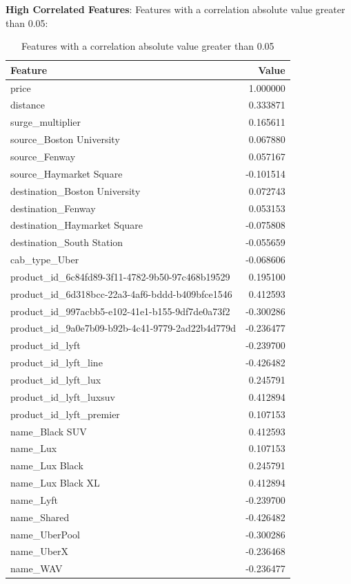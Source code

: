 \documentclass[a4paper,12pt]{article}
\begin{document}
\textbf{High Correlated Features}: Features with a correlation absolute value greater than 0.05: \\ 
\begin{table}[H]
    \centering
    \begin{tabular}{|l|r|}
    \hline
    \textbf{Feature} & \textbf{Value} \\
    \hline
    price & 1.000000 \\
    distance & 0.333871 \\
    surge\_multiplier & 0.165611 \\
    source\_Boston University & 0.067880 \\
    source\_Fenway & 0.057167 \\
    source\_Haymarket Square & -0.101514 \\
    destination\_Boston University & 0.072743 \\
    destination\_Fenway & 0.053153 \\
    destination\_Haymarket Square & -0.075808 \\
    destination\_South Station & -0.055659 \\
    cab\_type\_Uber & -0.068606 \\
    product\_id\_6c84fd89-3f11-4782-9b50-97c468b19529 & 0.195100 \\
    product\_id\_6d318bcc-22a3-4af6-bddd-b409bfce1546 & 0.412593 \\
    product\_id\_997acbb5-e102-41e1-b155-9df7de0a73f2 & -0.300286 \\
    product\_id\_9a0e7b09-b92b-4c41-9779-2ad22b4d779d & -0.236477 \\
    product\_id\_lyft & -0.239700 \\
    product\_id\_lyft\_line & -0.426482 \\
    product\_id\_lyft\_lux & 0.245791 \\
    product\_id\_lyft\_luxsuv & 0.412894 \\
    product\_id\_lyft\_premier & 0.107153 \\
    name\_Black SUV & 0.412593 \\
    name\_Lux & 0.107153 \\
    name\_Lux Black & 0.245791 \\
    name\_Lux Black XL & 0.412894 \\
    name\_Lyft & -0.239700 \\
    name\_Shared & -0.426482 \\
    name\_UberPool & -0.300286 \\
    name\_UberX & -0.236468 \\
    name\_WAV & -0.236477 \\
    \hline
    \end{tabular}
    \caption{Features with a correlation absolute value greater than 0.05}
    \label{tab:tab_1}
\end{table}    
\end{document}
